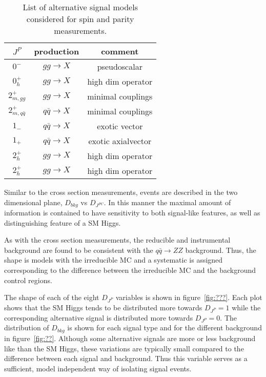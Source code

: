 \begin{table}
\begin{center}
\begin{tabular}{|c|c|c|}
\hline 
 $J^{P}$ & production & comment \\
\hline 
\hline
$0^-$            & $gg\to X$ & pseudoscalar \\ \hline
$0_h^+$          & $gg\to X$ & high dim operator \\ \hline
$2_{m,gg}^+$      & $gg\to X$ & minimal couplings \\ \hline
$2_{m,q\bar{q}}^+$ & $q\bar{q}\to X$ & minimal couplings \\ \hline
$1_{-}$          & $q\bar{q}\to X$ & exotic vector \\ \hline
$1_{+}$          & $q\bar{q}\to X$ & exotic axialvector \\ \hline
$2_{h}^+$        & $gg\to X$ & high dim operator \\ \hline
$2_{h}^+$        & $gg\to X$ & high dim operator \\ \hline
\end{tabular}
\label{table:HZZ4lAltSig}
\caption{List of alternative signal models considered for spin and 
parity measurements.}
\end{center}
\end{table}

Similar to the cross section measurements, events are described
in the two dimensional plane, $D_{bkg}$ vs $D_{J^{PC}}$.  In this
manner the maximal amount of information is contained to have 
sensitivity to both signal-like features, as well as distinguishing
feature of a SM Higgs. 

As with the cross section measurements, the reducible and
instrumental background are found to be consistent with the
$q\bar{q}\to ZZ$ background.  Thus, the shape is models with
the irreducible MC and a systematic is assigned corresponding 
to the difference between the irreducible MC and the background
control regions.  

The shape of each of the eight $D_{J^P}$ variables is shown in 
figure~\ref{fig:???}.  Each plot shows that the SM Higgs tends
to be distributed more towards $D_{J^P}=1$ while the corresponding
alternative signal is distributed more towards $D_{J^P}=0$. The
distribution of $D_{bkg}$ is shown for each signal type and for
the different background in figure~\ref{fig:??}.  Although 
some alternative signals are more or less background like than
the SM Higgs, these variations are typically small compared to 
the difference between each signal and background.  Thus this
variable serves as a sufficient, model independent way of
isolating signal events.  

